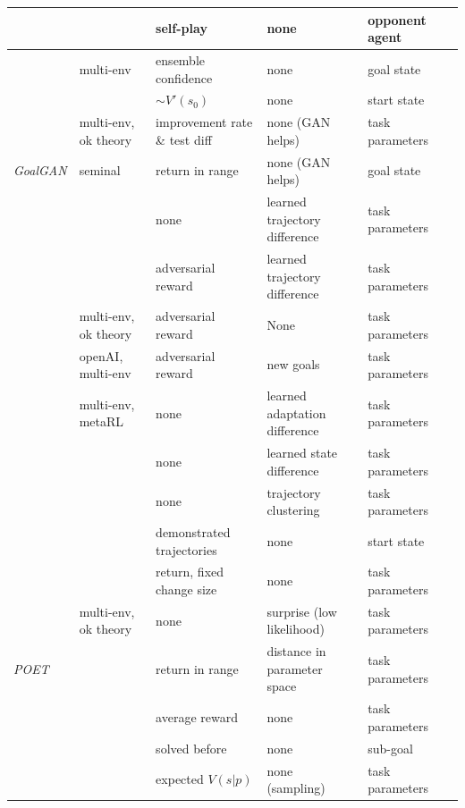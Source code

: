 \documentclass[letterpaper]{article}
\theoremstyle{definition}
\begin{document}
\begin{table}
\begin{tabular}{|l | l | l | l  | l|l|}
	\cite{Al-Shedivat2017} & & self-play & none & opponent agent \\ \hline
	\cite{Zhang2020} & multi-env & ensemble confidence & none & goal state \\ \hline
	\cite{Wohlke2020} & & $\sim V'(s_0)$ & none & start state \\ \hline
	\cite{Fang2020} & multi-env, ok theory & improvement rate \& test diff & none (GAN helps) & task parameters \\ \hline
	\textit{GoalGAN} \cite{Florensa2018} & seminal & return in range & none (GAN helps) & goal state \\ \hline
	\cite{Mehta2019} &  & none & learned trajectory difference & task parameters \\ \hline
	\cite{Raparthy2020} & & adversarial reward & learned trajectory difference & task parameters \\ \hline
	\cite{Sukhbaatar2017} & multi-env, ok theory & adversarial reward & None & task parameters \\ \hline
	\cite{OpenAI2021} & openAI, multi-env & adversarial reward & new goals & task parameters \\ \hline
	\cite{Mehta2020} & multi-env, metaRL & none & learned adaptation difference & task parameters \\ \hline
	\cite{Gupta2018} & & none & learned state difference & task parameters \\ \hline
	\cite{Jabri2019} & & none & trajectory clustering & task parameters \\ \hline
	\cite{Srinivasan2019} & & demonstrated trajectories & none & start state \\ \hline
	\cite{Akkaya2019} & & return, fixed change size & none & task parameters \\ \hline
	\cite{Kaddour2020} & multi-env, ok theory & none & surprise (low likelihood) & task parameters \\ \hline
	\textit{POET} \cite{Wang2019} & & return in range & distance in parameter space & task parameters \\ \hline
	\cite{Milano2021} & & average reward & none & task parameters \\ \hline
	\cite{Li} & & solved before & none & sub-goal \\ \hline
	\cite{Won2019} & & expected $V(s|p)$ & none (sampling) & task parameters \\ \hline
	
\end{tabular}
\end{table}
\end{document}
